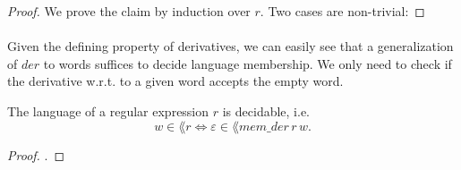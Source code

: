         \begin{proof}
            We prove the claim by induction over $r$. Two cases are non-trivial: 
        \end{proof}

        \paragraph{} 
        Given the defining property of derivatives, we can easily see that a generalization of $der$ to words suffices to decide language membership. We only need to check if the derivative w.r.t. to a given word accepts the empty word.


        \begin{theorem}
            \label{mem_der_correct} 
            The language of a regular expression $r$ is decidable, i.e.
            \begin{equation*}     w \in \lang{r} \Leftrightarrow \varepsilon \in \lang{mem\_der \, r \, w}.      \end{equation*}
            \end{theorem}
            \begin{proof}
                .
            \end{proof}




